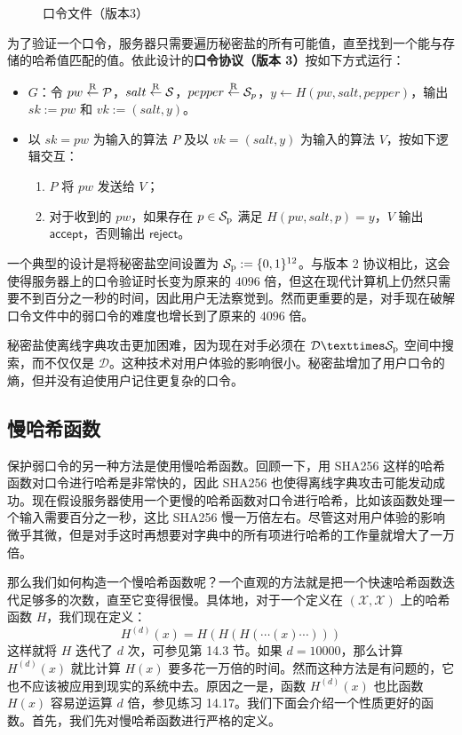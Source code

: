 \begin{figure}
  \centering
  
  \caption{口令文件（版本3）}
  \label{fig:18-5}
\end{figure}

为了验证一个口令，服务器只需要遍历秘密盐的所有可能值，直至找到一个能与存储的哈希值匹配的值。依此设计的\textbf{口令协议（版本 3）}按如下方式运行：
\begin{itemize}
	\item $G$：令 $pw\overset{\rm R}\leftarrow\mathcal{P}$，$salt\overset{\rm R}\leftarrow\mathcal{S}$，$pepper\overset{\rm R}\leftarrow\mathcal{S}_p$，$y\leftarrow H(pw,salt,pepper)$，输出 $sk:=pw$ 和 $vk:=(salt,y)$。
	\item 以 $sk=pw$ 为输入的算法 $P$ 及以 $vk=(salt,y)$ 为输入的算法 $V$，按如下逻辑交互：
	\begin{enumerate}
		\item $P$ 将 $pw$ 发送给 $V$；
		\item 对于收到的 $pw$，如果存在 $p\in\mathcal{S}_{\rm p}$ 满足 $H(pw,salt,p)=y$，$V$ 输出 $\mathsf{accept}$，否则输出 $\mathsf{reject}$。
	\end{enumerate}
\end{itemize}

一个典型的设计是将秘密盐空间设置为 $\mathcal{S}_{\rm p}:=\{0,1\}^{12}$。与版本 2 协议相比，这会使得服务器上的口令验证时长变为原来的 $4096$ 倍，但这在现代计算机上仍然只需要不到百分之一秒的时间，因此用户无法察觉到。然而更重要的是，对手现在破解口令文件中的弱口令的难度也增长到了原来的 $4096$ 倍。

秘密盐使离线字典攻击更加困难，因为现在对手必须在 $\mathcal{D}×\mathcal{S}_{\rm p}$ 空间中搜索，而不仅仅是 $\mathcal{D}$。这种技术对用户体验的影响很小。秘密盐增加了用户口令的熵，但并没有迫使用户记住更复杂的口令。

\subsection{慢哈希函数}

保护弱口令的另一种方法是使用慢哈希函数。回顾一下，用 SHA256 这样的哈希函数对口令进行哈希是非常快的，因此 SHA256 也使得离线字典攻击可能发动成功。现在假设服务器使用一个更慢的哈希函数对口令进行哈希，比如该函数处理一个输入需要百分之一秒，这比 SHA256 慢一万倍左右。尽管这对用户体验的影响微乎其微，但是对手这时再想要对字典中的所有项进行哈希的工作量就增大了一万倍。

那么我们如何构造一个慢哈希函数呢？一个直观的方法就是把一个快速哈希函数迭代足够多的次数，直至它变得很慢。具体地，对于一个定义在 $(\mathcal{X},\mathcal{X})$ 上的哈希函数 $H$，我们现在定义：
\begin{equation}\label{eq:18-5}
	H^{(d)}(x)=H(H(H(\cdots(x)\cdots)))
\end{equation}
这样就将 $H$ 迭代了 $d$ 次，可参见第 14.3 节。如果 $d=10000$，那么计算 $H^{(d)}(x)$ 就比计算 $H(x)$ 要多花一万倍的时间。然而这种方法是有问题的，它也不应该被应用到现实的系统中去。原因之一是，函数 $H^{(d)}(x)$ 也比函数 $H(x)$ 容易逆运算 $d$ 倍，参见练习 14.17。我们下面会介绍一个性质更好的函数。首先，我们先对慢哈希函数进行严格的定义。

